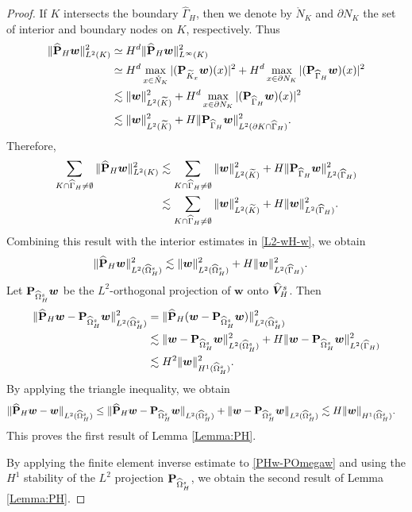 \documentclass[10pt,a4paper]{amsart}
\newcommand{\bs}[1]{\boldsymbol{#1}}
\begin{document}
\begin{proof}
If $K$ intersects the boundary $\widehat\Gamma_H$, then we denote by $\mathring N_K$ and $\partial N_K$ the set of interior and boundary nodes on $K$, respectively. Thus 
\begin{align*}
\|\widehat{\bf P}_H{\bs w}\|_{L^2(K)}^2
&\simeq H^d\|\widehat{\bf P}_H{\bs w}\|_{L^\infty(K)}^2 \\
&\simeq H^d\max_{x\in \mathring N_K}|({\bf P}_{\widetilde K_x}{\bs w})(x)|^2 + H^d\max_{x\in \partial N_K}|({\bf P}_{\widehat\Gamma_H}{\bs w})(x)|^2 \\
&\lesssim \|{\bs w}\|_{L^2(\widetilde K)}^2 + H^d\max_{x\in \partial N_K}|({\bf P}_{\widehat\Gamma_H}{\bs w})(x)|^2 \\
&\lesssim \|{\bs w}\|_{L^2(\widetilde K)}^2 + H \|{\bf P}_{\widehat\Gamma_H}{\bs w}\|_{L^2(\partial K \cap \widehat\Gamma_H)}^2 .
\end{align*}
Therefore, 
\begin{align*}
\sum_{K\cap\widehat\Gamma_H\neq\emptyset} \|\widehat{\bf P}_H{\bs w}\|_{L^2(K)}^2
&\lesssim \sum_{K\cap\widehat\Gamma_H\neq\emptyset}\|{\bs w}\|_{L^2(\widetilde K)}^2 + 
H \|{\bf P}_{\widehat\Gamma_H}{\bs w}\|_{L^2(\widehat\Gamma_H)}^2 \\
&\lesssim \sum_{K\cap\widehat\Gamma_H\neq\emptyset}\|{\bs w}\|_{L^2(\widetilde K)}^2 + 
H \|{\bs w}\|_{L^2(\widehat\Gamma_H)}^2 .
\end{align*}
Combining this result with the interior estimates in \eqref{L2-wH-w}, we obtain  
\begin{align*}
\|\widehat{\bf P}_H{\bs w}\|_{L^2(\widehat\Omega^{\rm s}_H)}^2
&\lesssim \|{\bs w}\|_{L^2(\widehat\Omega^{\rm s}_H)}^2  + 
H \|{\bs w}\|_{L^2(\widehat\Gamma_H)}^2 .
\end{align*}
Let ${\bf P}_{\widehat\Omega^{\rm s}_H}{\bs w}$ be the $L^2$-orthogonal projection of ${\bs w}$ onto $\widehat{\bs V}^{\rm s}_H$. Then 
\begin{align}\label{PHw-POmegaw}
\|\widehat{\bf P}_H{\bs w}-{\bf P}_{\widehat\Omega^{\rm s}_H}{\bs w}\|_{L^2(\widehat\Omega^{\rm s}_H)}^2
&= 
\|\widehat{\bf P}_H({\bs w}-{\bf P}_{\widehat\Omega^{\rm s}_H}{\bs w})\|_{L^2(\widehat\Omega^{\rm s}_H)}^2 \notag\\
&\lesssim \|{\bs w}-{\bf P}_{\widehat\Omega^{\rm s}_H}{\bs w}\|_{L^2(\widehat\Omega^{\rm s}_H)}^2  + 
H \|{\bs w}-{\bf P}_{\widehat\Omega^{\rm s}_H}{\bs w}\|_{L^2(\widehat\Gamma_H)}^2 \notag\\
&\lesssim H^2\|{\bs w}\|_{H^1(\widehat\Omega^{\rm s}_H)}^2  .
\end{align}
By applying the triangle inequality, we obtain 
\begin{align*}
\|\widehat{\bf P}_H{\bs w}-{\bs w}\|_{L^2(\widehat\Omega^{\rm s}_H)}
\le 
\|\widehat{\bf P}_H{\bs w}-{\bf P}_{\widehat\Omega^{\rm s}_H}{\bs w}\|_{L^2(\widehat\Omega^{\rm s}_H)}
+ \|{\bs w}-{\bf P}_{\widehat\Omega^{\rm s}_H}{\bs w}\|_{L^2(\widehat\Omega^{\rm s}_H)} 
&\lesssim H\|{\bs w}\|_{H^1(\widehat\Omega^{\rm s}_H)}.
\end{align*}
This proves the first result of Lemma \ref{Lemma:PH}. 

By applying the finite element inverse estimate to \eqref{PHw-POmegaw} and using the $H^1$ stability of the $L^2$ projection ${\bf P}_{\widehat\Omega^{\rm s}_H}$, we obtain the second result of Lemma \ref{Lemma:PH}. 
\end{proof}
\end{document}
